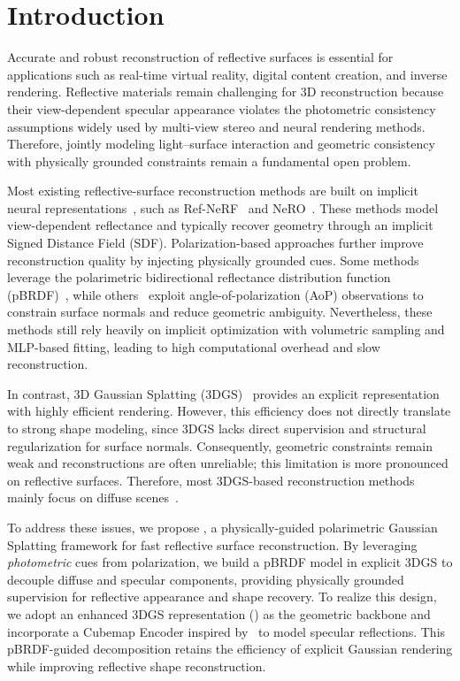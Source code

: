 \section{Introduction}

Accurate and robust reconstruction of reflective surfaces is essential for applications such as real-time 
virtual reality, digital content creation, and inverse rendering. Reflective materials remain challenging for 
3D reconstruction because their view-dependent specular appearance violates the photometric consistency 
assumptions widely used by multi-view stereo and neural rendering methods. Therefore, jointly modeling 
light--surface interaction and geometric consistency with physically grounded constraints remain a fundamental open problem.

Most existing reflective-surface reconstruction methods are built on implicit neural representations~\citep{mildenhall2020nerf}, 
such as Ref-NeRF~\citep{verbin2022ref} and NeRO~\citep{liu2023nero}. 
These methods model view-dependent reflectance and typically recover geometry through an implicit Signed Distance Field (SDF). 
Polarization-based approaches further improve reconstruction quality by injecting physically grounded cues. 
Some methods~\citep{dave2022pandora,han2024nersp,li2024neisf,li2025neisf++} leverage the polarimetric bidirectional reflectance distribution function (pBRDF)~\citep{baek2018simultaneous}, 
while others~\citep{zhao2022polarimetric,cao2023multi,han2024nersp,chen2024pisr} exploit angle-of-polarization (AoP) observations to constrain surface normals and reduce geometric ambiguity. 
Nevertheless, these methods still rely heavily on implicit optimization with volumetric sampling and MLP-based fitting, leading to high computational overhead and slow reconstruction.

In contrast, 3D Gaussian Splatting (3DGS)~\citep{kerbl20233d} provides an explicit representation with highly efficient rendering. 
However, this efficiency does not directly translate to strong shape modeling, since 3DGS lacks direct supervision and structural regularization for surface normals. 
Consequently, geometric constraints remain weak and reconstructions are often unreliable; this limitation is more pronounced on reflective surfaces.
Therefore, most 3DGS-based reconstruction methods mainly focus on diffuse scenes~\citep{chen2023neusg,yu2024gsdf,lyu20243dgsr,guedon2024sugar,dai2024high,huang20242d}. 

To address these issues, we propose \textbf{\polgs}, a physically-guided polarimetric Gaussian Splatting framework for fast reflective surface reconstruction. 
By leveraging \emph{photometric} cues from polarization, we build a pBRDF model in explicit 3DGS to decouple diffuse and specular components, providing physically grounded supervision for reflective appearance and shape recovery. 
To realize this design, we adopt an enhanced 3DGS representation (\gs) as the geometric backbone and incorporate a Cubemap Encoder inspired by \dr\ to model specular reflections. 
This pBRDF-guided decomposition retains the efficiency of explicit Gaussian rendering while improving reflective shape reconstruction.

